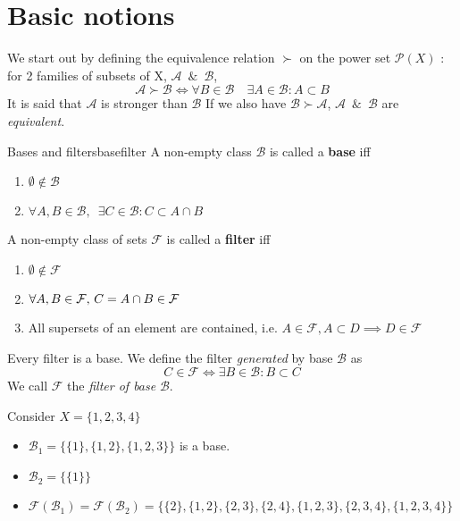 \section{Basic notions}
We start out by defining the equivalence relation $\succ$ on the power set $\mathcal{P}(X)$ : for 2 families of subsets of X, $\mathcal{A} \enspace \& \enspace \mathcal{B}$,
$$\mathcal{A}\succ \mathcal{B} \iff \forall B\in\mathcal{B} \quad \exists A\in \mathcal{B}: A\subset B $$
It is said that $\mathcal{A}$ is stronger than $\mathcal{B}$ If we also have $\mathcal{B}\succ \mathcal{A}$, $\mathcal{A} \enspace \& \enspace \mathcal{B}$ are \textit{equivalent}.\\
\begin{mydef}{Bases and filters}{basefilter}
	A non-empty class $\mathcal{B}$ is called a \textbf{base} iff
	\begin{enumerate}
		\item $\emptyset\notin \mathcal{B}$
		\item $\forall A, B \in \mathcal{B}, \enspace \exists C\in \mathcal{B} : C \subset A \cap B$
	\end{enumerate}
	A non-empty class of sets $\mathcal{F}$ is called a \textbf{filter} iff
	\begin{enumerate}
		\item $\emptyset\notin \mathcal{F}$
		\item $\forall A, B \in \mathcal{F}, \thinspace C = A\cap B\in \mathcal{F}$
			\item All supersets of an element are contained, i.e. $A\in \mathcal{F}, A\subset D \implies D \in \mathcal{F}$
	\end{enumerate}
	\tcblower
	Every filter is a base. We define the filter \textit{generated} by base $\mathcal{B}$ as
	$$C\in \mathcal{F} \iff \exists B \in \mathcal{B} : B\subset C$$
	We call $\mathcal{F}$ the \textit{filter of base} $\mathcal{B}$.
\end{mydef}
\begin{myeg}{}
	Consider $X=\{1, 2, 3, 4\}$
	\begin{itemize}
		\item $\mathcal{B}_1=\{ \{1\}, \{1, 2\}, \{1, 2, 3\} \}$ is a base.
		\item $\mathcal{B}_2=\{ \{1\}\}$

		\item $\mathcal{F}(\mathcal{B}_1) = \mathcal{F}( \mathcal{B}_2 ) =\{\{2\}, \{1, 2\}, \{2, 3\}, \{2, 4\}, \{1, 2, 3\}, \{2, 3, 4\}, \{1, 2, 3, 4\}\} $
	\end{itemize}
\end{myeg}
